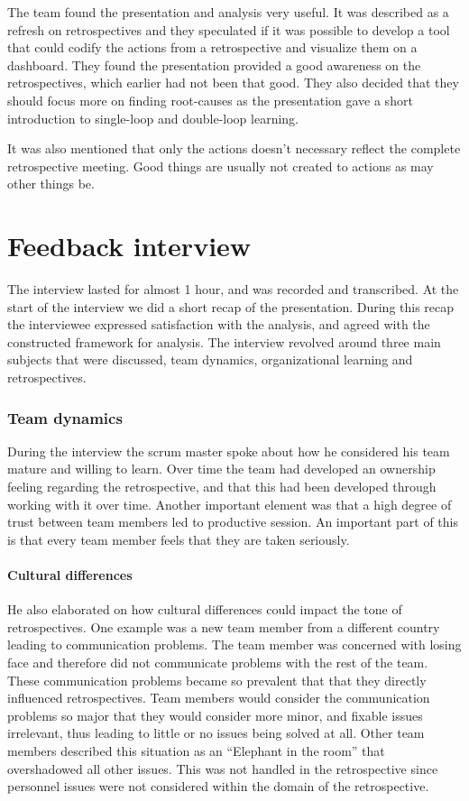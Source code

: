 The team found the presentation and analysis very useful. It was described as a refresh on retrospectives and they speculated if it was possible to develop a tool that could codify the actions from a retrospective and visualize them on a dashboard. They found the presentation provided a good awareness on the retrospectives, which earlier had not been that good. They also decided that they should focus more on finding root-causes as the presentation gave a short introduction to single-loop and double-loop learning.

It was also mentioned that only the actions doesn't necessary reflect the complete retrospective meeting. Good things are usually not created to actions as may other things be. 
\clearpage

\section{Feedback interview}
The interview lasted for almost 1 hour, and was recorded and transcribed. At the start of the interview we did a short recap of the presentation. During this recap the interviewee expressed satisfaction with the analysis, and agreed with the constructed framework for analysis. The interview revolved around three main subjects that were discussed, team dynamics, organizational learning and retrospectives.
\subsubsection{Team dynamics}
During the interview the scrum master spoke about how he considered his team mature and willing to learn. Over time the team had developed an ownership feeling regarding the retrospective, and that this had been developed through working with it over time. Another important element was that a high degree of trust between team members led to productive session. An important part of this is that every team member feels that they are taken seriously.

\paragraph{Cultural differences}
He also elaborated on how cultural differences could impact the tone of retrospectives. One example was a new team member from a different country leading to communication problems. The team member was concerned with losing face and therefore did not communicate problems with the rest of the team. These communication problems became so prevalent that that they directly influenced retrospectives. Team members would consider the communication problems so major that they would consider more minor, and fixable issues irrelevant, thus leading to little or no issues being solved at all.  Other team members described this situation as an ``Elephant in the room'' that overshadowed all other issues. This was not handled in the retrospective since personnel issues were not considered within the domain of the retrospective.

